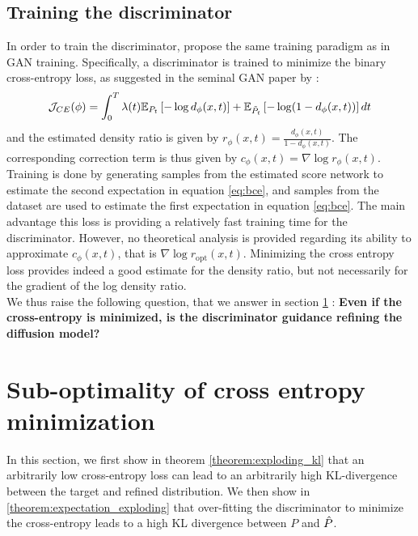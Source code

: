 \subsection{Training the discriminator}
In order to train the discriminator, \citep{kim2023refininggenerativeprocessdiscriminator} propose the same training paradigm as in GAN training. Specifically, a discriminator is trained to minimize the binary cross-entropy loss, as suggested in the seminal GAN paper by \citep{goodfellow2014generativeadversarialnetworks} : 
\begin{equation}\label{eq:bce}
    \mathcal{J}_{CE}(\phi) = \int_{0}^{T} \lambda(t) \mathbb{E}_{P_{t}}\left[-\log d_{\phi}(x,t) \right] + \mathbb{E}_{\Tilde{P}_{t}}\left[ -\log(1 - d_{\phi}(x,t))  \right]dt
\end{equation}
and the estimated density ratio is given by $r_{\phi}(x,t) = \frac{d_{\phi}(x,t)}{1 - d_{\phi}(x,t)}$. The corresponding correction term is thus given by $c_{\phi}(x,t) = \nabla \log r_{\phi}(x,t)$. 
Training is done by generating samples from the estimated score network to estimate the second expectation in equation \ref{eq:bce}, and samples from the dataset are used to estimate the first expectation in equation \ref{eq:bce}. The main advantage this loss is providing a relatively fast training time for the discriminator.
However, no theoretical analysis is provided regarding its ability to approximate $c_{\phi}(x,t)$, that is $\nabla \log r_{\mathrm{opt}}(x,t)$. Minimizing the cross entropy loss provides indeed a good estimate for the density ratio, but not necessarily for the gradient of the log density ratio.
\\
We thus raise the following question, that we answer in section \ref*{sec:dg:sec2} : \textbf{Even if the cross-entropy is minimized, is the discriminator guidance refining the diffusion model?}

\section{Sub-optimality of cross entropy minimization}\label{sec:dg:sec2}
In this section, we first show in theorem \ref{theorem:exploding_kl} that an arbitrarily low cross-entropy loss can lead to an arbitrarily high KL-divergence between the target and refined distribution. We then show in \ref*{theorem:expectation_exploding} that over-fitting the discriminator to minimize the cross-entropy leads to a high KL divergence between $P$ and $\Hat{P}$.



